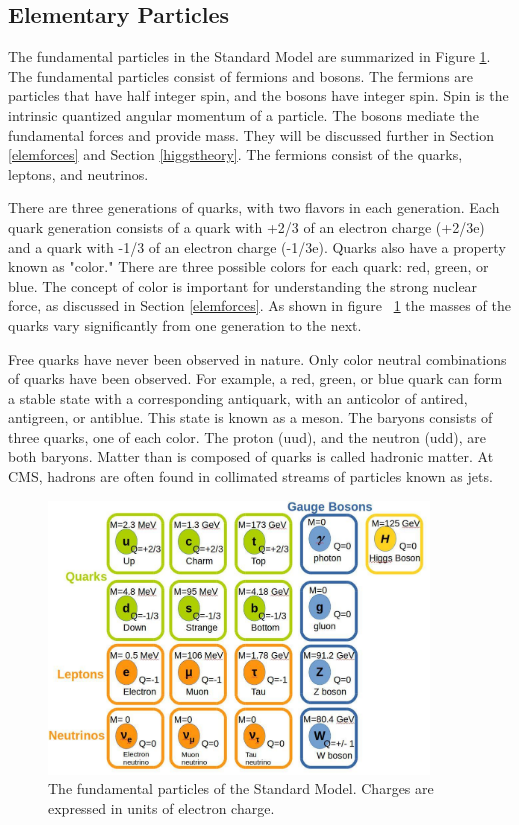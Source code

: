 \documentclass[oneside, letterpaper, oldfontcommands]{memoir}
\begin{document}
\subsection{Elementary Particles}\label{elemparticles}
\qquad The fundamental particles in the Standard Model are summarized in Figure \ref{fig:SMParticles}. The fundamental particles consist of fermions and bosons. The fermions are particles that have half integer spin, and the bosons have integer spin. Spin is the intrinsic quantized angular momentum of a particle. The bosons mediate the fundamental forces and provide mass. They will be discussed further in Section \ref{elemforces} and Section \ref{higgstheory}. The fermions consist of the quarks, leptons, and neutrinos. 

\qquad There are three generations of quarks, with two flavors in each generation. Each quark generation consists of a quark with +2/3 of an electron charge (+2/3e) and a quark with -1/3 of an electron charge (-1/3e). Quarks also have a property known as "color." There are three possible colors for each quark: red, green, or blue. The concept of color is important for understanding the strong nuclear force, as discussed in Section \ref{elemforces}. As shown in figure ~\ref{fig:SMParticles} the masses of the quarks vary significantly from one generation to the next.

\qquad Free quarks have never been observed in nature. Only color neutral combinations of quarks have been observed. For example, a red, green, or blue quark can form a stable state with a corresponding antiquark, with an anticolor of antired, antigreen, or antiblue. This state is known as a meson. The baryons consists of three quarks, one of each color. The proton (uud), and the neutron (udd), are both baryons. Matter than is composed of quarks is called hadronic matter. At CMS, hadrons are often found in collimated streams of particles known as jets. 

\begin{figure}[here]
\includegraphics[width=0.9\textwidth]{StandardModel.pdf}
\caption{The fundamental particles of the Standard Model. Charges are expressed in units of electron charge.\cite{Agashe:2014kda} }
\label{fig:SMParticles}
\end{figure}
\end{document}

